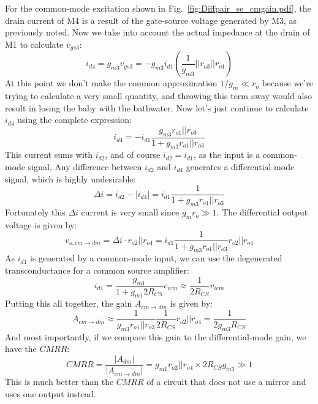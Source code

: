 For the common-mode excitation shown in Fig.~\ref{fig:Diffpair_se_cmgain.pdf}, the drain current of M4 is a result of the gate-source voltage generated by M3, as previously noted.  Now we take into account the actual impedance at the drain of M1 to calculate $v_{gs3}$:
\begin{equation}
	i_{d4} = g_{m3} v_{gs3} = -g_{m3} i_{d1} \left( \frac{1}{g_{m3}} || r_{o3} || r_{o1} \right) 
\end{equation}
At this point we don't make the common approximation $1/g_m \ll r_o$ because we're trying to calculate a very small quantity, and throwing this term away would also result in losing the baby with the bathwater.  Now let's just continue to calculate $i_{d4}$ using the complete expression:
\begin{equation}
	i_{d4} =  -i_{d1}  \frac{g_{m3} r_{o1} || r_{o3}}{1 + g_{m3} r_{o1} || r_{o3}}
\end{equation}
This current sums with $i_{d2}$, and of course $i_{d2} = i_{d1}$, as the input is a common-mode signal. Any difference between $i_{d2}$ and $i_{d4}$ generates a differential-mode signal, which is highly undesirable:
\begin{equation}
	\Delta i = i_{d2} - | i_{d4} | = i_{d1}  \frac{1}{1 + g_{m3} r_{o1} || r_{o3}}
\end{equation}
Fortunately this $\Delta i$ current is very small since $g_m r_o \gg 1$.  The differential output voltage is given by:
\begin{equation}
	v_{o,cm\to dm} = \Delta i \cdot r_{o2}||r_{o4} = i_{d1}  \frac{1}{1 + g_{m3} r_{o1} || r_{o3}} r_{o2}||r_{o4}
\end{equation}
As $i_{d1}$ is generated by a common-mode input, we can use the degenerated transconductance for a common source amplifier:
\begin{equation}
	i_{d1} = \frac{g_{m1}}{1 + g_{m1} 2 R_{CS}} v_{icm} \approx \frac{1}{2 R_{CS}} v_{icm}
\end{equation}
Putting this all together, the gain $A_{cm \to dm}$ is given by:
\begin{equation}
	{A_{cm \to dm }} \approx  \frac{1}{g_{m3} r_{o1} || r_{o3}} \frac{1}{2 R_{CS}}  r_{o2}||r_{o4} = \frac{1}{2 g_{m3} R_{CS}} 
\end{equation}
And most importantly, if we compare this gain to the differential-mode gain, we have the $CMRR$:
\begin{equation}
	CMRR = \frac{{\left| {{A_{dm}}} \right|}}{{\left| {{A_{cm \to dm}}} \right|}} 
	= {g_{m1}} r_{o2} || r_{o4} \times 2 R_{CS} g_{m3}  \gg 1
\end{equation}
This is much better than the $CMRR$ of a circuit that does not use a mirror and uses one output instead.
